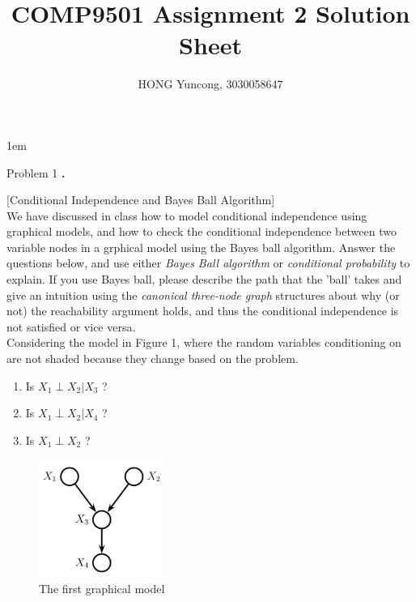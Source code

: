 \documentclass{article}
\newcounter{pcounter}                                   %
\newenvironment{problem}                                %
{                                                       %
    \color{gray}                                        %
    \stepcounter{pcounter}                              %
    \textbf{\arabic{pcounter}.}                         %
}{}                                                     %
\begin{document}
    \parindent 0in
    \parskip 1em
    \title{COMP9501 Assignment 2 Solution Sheet}
    \author{HONG Yuncong, 3030058647}
    \maketitle

    \begin{section}{Problem 1}
        \setcounter{pcounter}{0}
        \begin{problem}
            [Conditional Independence and Bayes Ball Algorithm]\\
            We have discussed in class how to model conditional independence using graphical models, and how to check the conditional independence between two variable nodes in a grphical model using the Bayes ball algorithm. Answer the questions below, and use either \textit{Bayes Ball algorithm} or \textit{conditional probability} to explain. If you use Bayes ball, please describe the path that the 'ball' takes and give an intuition using the \textit{canonical three-node graph} structures about why (or not) the reachability argument holds, and thus the conditional independence is not satisfied or vice versa.\\
            Considering the model in Figure 1, where the random variables conditioning on are not shaded because they change based on the problem.
            \begin{enumerate}[label=(\alph*)]
                \item Is $X_1 \perp X_2 | X_3$ ?
                \item Is $X_1 \perp X_2 | X_4$ ?
                \item Is $X_1 \perp X_2$ ?
            \end{enumerate}
            \begin{figure}[H]
                \label{fig:m1}
                \centering
                \includegraphics[width=0.37\textwidth]{a2_p11_1}
                \caption{The first graphical model}
            \end{figure}


\end{problem}
\end{section}
\end{document}

